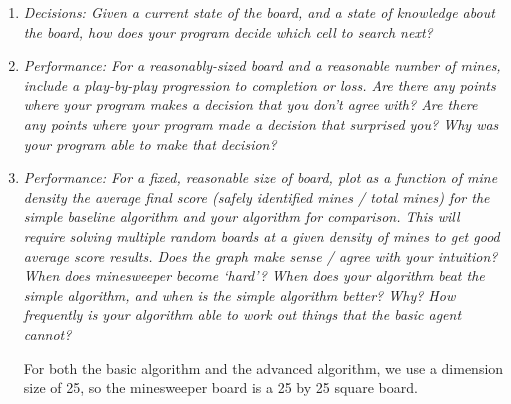 \documentclass[12pt, twoside]{article}
\begin{document}
\begin{enumerate}[itemsep=2mm,parsep=4mm]
    \item 
        \textit{Decisions: Given a current state of the board, and a state of knowledge about the board, how does  your program decide which cell to search next?}

    \item 
        \textit{Performance: For a reasonably-sized board and a reasonable number of mines, include a play-by-play progression to completion or loss. Are there any points where your program makes a decision that you don’t agree with? Are there any points where your program made a decision that surprised you?  Why was your program able to make that decision?}

    \item 
        \textit{Performance: For a fixed, reasonable size of board, plot as a function of mine density the average final score (safely identified mines / total mines) for the simple baseline algorithm and your algorithm for comparison. This will require solving multiple random boards at a given density of mines to get good average score results. Does the graph make sense / agree with your intuition? When does minesweeper become ‘hard’? When does your algorithm beat the simple algorithm, and when is the simple algorithm better? Why? How frequently is your algorithm able to work out things that the basic agent cannot?}

        For both the basic algorithm and the advanced algorithm, we use a dimension size of 25, so the minesweeper board is a 25 by 25 square board.


\end{enumerate}
\end{document}
